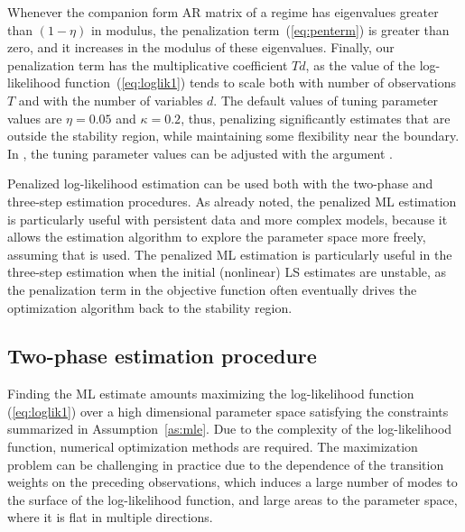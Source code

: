 \documentclass[nojss]{jss}
\begin{document}
Whenever the companion form AR matrix of a regime has eigenvalues greater than $(1 - \eta)$ in modulus, the penalization term~(\ref{eq:penterm}) is greater than zero, and it increases in the modulus of these eigenvalues. Finally, our penalization term has the multiplicative coefficient $Td$, as the value of the log-likelihood function~(\ref{eq:loglik1}) tends to scale both with number of observations $T$ and with the number of variables $d$. The default values of tuning parameter values are $\eta = 0.05$ and $\kappa = 0.2$, thus, penalizing significantly estimates that are outside the stability region, while maintaining some flexibility near the boundary. In , the tuning parameter values can be adjusted with the argument .

Penalized log-likelihood estimation can be used both with the two-phase and three-step estimation procedures. As already noted, the penalized ML estimation is particularly useful with persistent data and more complex models, because it allows the estimation algorithm to explore the parameter space more freely, assuming that  is used. The penalized ML estimation is particularly useful in the three-step estimation when the initial (nonlinear) LS estimates are unstable, as the penalization term in the objective function often eventually drives the optimization algorithm back to the stability region.

\subsection{Two-phase estimation procedure}\label{sec:estimscheme}

Finding the ML estimate amounts maximizing the log-likelihood function (\ref{eq:loglik1}) over a high dimensional parameter space satisfying the constraints summarized in Assumption~\ref{as:mle}. Due to the complexity of the log-likelihood function, numerical optimization methods are required. The maximization problem can be challenging in practice due to the dependence of the transition weights on the preceding observations, which induces a large number of modes to the surface of the log-likelihood function, and large areas to the parameter space, where it is flat in multiple directions.
\end{document}
